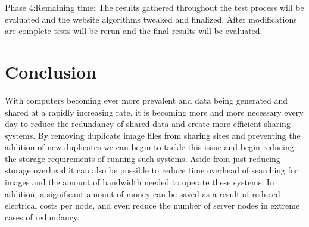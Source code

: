 \documentclass[11pt]{article}
\begin{document}
Phase 4:Remaining time: The results gathered throughout the test process will be evaluated and
the website algorithms tweaked and finalized. After modifications are complete tests will be rerun and the
final results will be evaluated.
\vspace*{-.1in}
\section{Conclusion}
\label{sec:conclusion}
\vspace*{-.1in}


With computers becoming ever more prevalent and data being generated and shared at a rapidly increasing rate, it is becoming more and more necessary every day to reduce the redundancy of shared data and create more efficient sharing systems. By removing duplicate image files from
sharing sites and preventing the addition of new duplicates we can begin to tackle this issue and begin reducing the storage requirements of running such systems. Aside from just reducing storage overhead it can also be possible to reduce time overhead of searching for images and the amount of bandwidth needed to operate these systems. In addition, a significant amount of money can be saved as a result of reduced electrical costs per node, and even reduce the number of server nodes in extreme cases of redundancy.

\newpage
\nocite{*}


\end{document}

